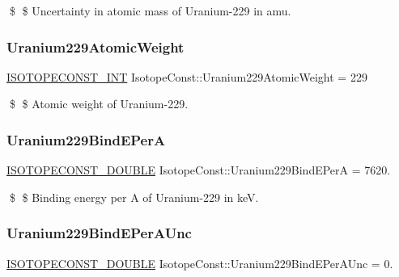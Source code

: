 \$ \$ Uncertainty in atomic mass of Uranium-\/229 in amu. \mbox{\label{group___isotope_const-_uranium-_u229_gab3ffad34a2edbc78ccad2b7a966cb59f}} 
\subsubsection{\texorpdfstring{Uranium229\+Atomic\+Weight}{Uranium229AtomicWeight}}
{\footnotesize\ttfamily \mbox{\hyperlink{group___isotope_const-_macros_ga5f18360b3e99483a35c32d789e62621c}{I\+S\+O\+T\+O\+P\+E\+C\+O\+N\+S\+T\+\_\+\+I\+NT}} Isotope\+Const\+::\+Uranium229\+Atomic\+Weight = 229}

\$ \$ Atomic weight of Uranium-\/229. \mbox{\label{group___isotope_const-_uranium-_u229_ga870fec73a6a29324dad7bddee53ecbd8}} 
\subsubsection{\texorpdfstring{Uranium229\+Bind\+E\+PerA}{Uranium229BindEPerA}}
{\footnotesize\ttfamily \mbox{\hyperlink{group___isotope_const-_macros_ga8f45a7272ce02c0b4c65c44636ed719a}{I\+S\+O\+T\+O\+P\+E\+C\+O\+N\+S\+T\+\_\+\+D\+O\+U\+B\+LE}} Isotope\+Const\+::\+Uranium229\+Bind\+E\+PerA = 7620.}

\$ \$ Binding energy per A of Uranium-\/229 in keV. \mbox{\label{group___isotope_const-_uranium-_u229_ga763548f64bed280e210ced2d667b55cd}} 
\subsubsection{\texorpdfstring{Uranium229\+Bind\+E\+Per\+A\+Unc}{Uranium229BindEPerAUnc}}
{\footnotesize\ttfamily \mbox{\hyperlink{group___isotope_const-_macros_ga8f45a7272ce02c0b4c65c44636ed719a}{I\+S\+O\+T\+O\+P\+E\+C\+O\+N\+S\+T\+\_\+\+D\+O\+U\+B\+LE}} Isotope\+Const\+::\+Uranium229\+Bind\+E\+Per\+A\+Unc = 0.}

